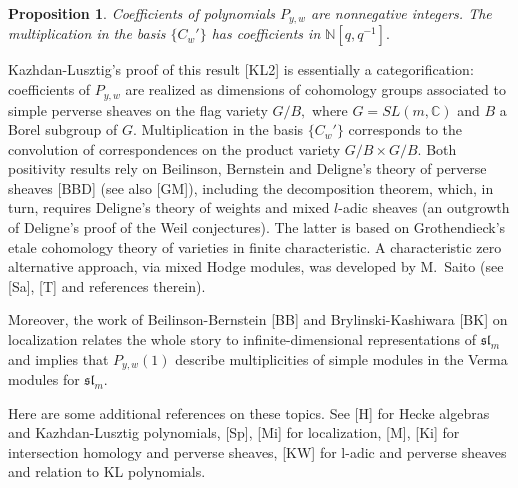 \documentclass[12pt]{article}
\newtheorem{prop}{Proposition}
\begin{document}
\begin{prop} Coefficients of polynomials $P_{y,w}$ are nonnegative 
integers. The multiplication in the basis $\{C_w'\}$ has coefficients 
in $\mathbb{N}[q,q^{-1}].$ 
\end{prop} 

Kazhdan-Lusztig's proof of this result [KL2] is essentially a categorification: 
coefficients of $P_{y,w}$ are realized as dimensions of cohomology 
groups associated to simple perverse sheaves on the flag variety 
$G/B,$ where $G=SL(m,\mathbb{C})$ and $B$ a Borel subgroup of $G.$ 
 Multiplication in the basis $\{C_w'\}$ 
corresponds to the convolution of correspondences
on the product variety $G/B\times G/B.$ Both positivity results 
rely on  Beilinson, Bernstein and Deligne's theory of perverse 
sheaves [BBD] (see also [GM]), including the decomposition theorem, which, in 
turn, requires Deligne's theory of weights and mixed $l$-adic 
sheaves (an outgrowth of Deligne's proof of the Weil conjectures). 
The latter is based on Grothendieck's etale cohomology theory 
of varieties in finite characteristic. 
A characteristic zero alternative approach, via mixed Hodge modules, 
was developed by M.~Saito (see [Sa], [T] and references therein). 
 
\vspace{0.1in} 

Moreover, the work of Beilinson-Bernstein [BB] and 
Brylinski-Kashiwara [BK] on localization relates the whole story 
to infinite-dimensional representations  of $\mathfrak{sl}_m$ 
and implies that $P_{y,w}(1)$ describe multiplicities 
of simple modules in the Verma modules for $\mathfrak{sl}_m.$ 

\vspace{0.1in} 

Here are some additional references on these topics. See [H] for Hecke algebras  
and Kazhdan-Lusztig polynomials, [Sp], [Mi] for localization, 
[M], [Ki] for intersection homology and perverse sheaves, [KW] for 
l-adic and perverse sheaves and relation to KL polynomials. 

\vspace{0.1in} 
\end{document}
